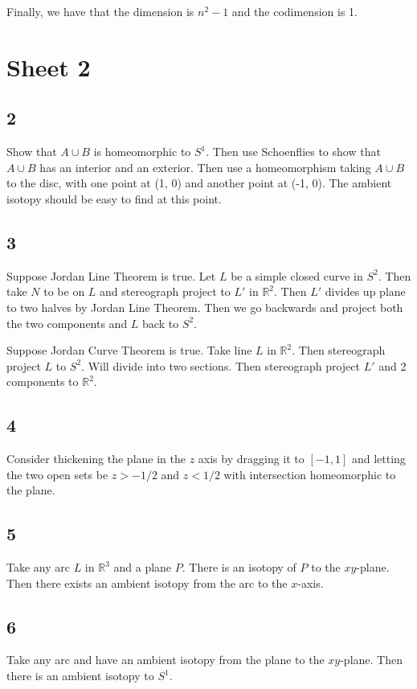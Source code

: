 \documentclass{article}
\theoremstyle{definition}
\numberwithin{theorem}{section}
\numberwithin{equation}{section}
\begin{document}
Finally, we have that the dimension is $n^2-1$ and the codimension is 1. 

\section{Sheet 2}

\subsection{2}
Show that $A \cup B$ is homeomorphic to $S^1$. Then use Schoenflies to show that $A \cup B$ has an interior and an exterior. Then use a homeomorphism taking $A \cup B$ to the disc, with one point at (1, 0) and another point at (-1, 0). The ambient isotopy should be easy to find at this point. 

\subsection{3}
Suppose Jordan Line Theorem is true. Let $L$ be a simple closed curve in $S^2$. Then take $N$ to be on $L$ and stereograph project to $L'$ in $\mathbb{R}^2$. Then $L'$ divides up plane to two halves by Jordan Line Theorem. Then we go backwards and project both the two components and $L$ back to $S^2$. 

Suppose Jordan Curve Theorem is true. Take line $L$ in $\mathbb{R}^2$. Then stereograph project $L$ to $S^2$. Will divide into two sections. Then stereograph project $L'$ and 2 components to $\mathbb{R}^2$.  

\subsection{4}
Consider thickening the plane in the $z$ axis by dragging it to $[-1,1]$ and letting the two open sets be $z > -1/2$ and $z < 1/2$ with intersection homeomorphic to the plane. 
\subsection{5}
Take any arc $L$ in $\mathbb{R}^3$ and a plane $P$. There is an isotopy of $P$ to the $xy$-plane. Then there exists an ambient isotopy from the arc to the $x$-axis. 

\subsection{6}

Take any arc and have an ambient isotopy from the plane to the $xy$-plane. Then there is an ambient isotopy to $S^1$. 
\end{document}
